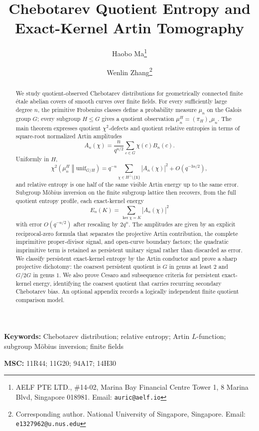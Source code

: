 \documentclass[12pt,a4paper]{article}
\title{Chebotarev Quotient Entropy and Exact-Kernel Artin Tomography}
\author{
  Haobo Ma\thanks{AELF PTE LTD., \#14-02, Marina Bay Financial Centre Tower 1, 8 Marina Blvd, Singapore 018981. Email: \texttt{auric@aelf.io}}
  \and
  Wenlin Zhang\thanks{Corresponding author. National University of Singapore, Singapore. Email: \texttt{e1327962@u.nus.edu}}
}
\date{}
\theoremstyle{plain}
\theoremstyle{definition}
\numberwithin{equation}{section}
\newcommand{\ind}{\mathbf{1}}
\newcommand{\etale}{\'etale}
\begin{document}
\maketitle

\begin{abstract}
We study quotient-observed Chebotarev distributions for geometrically connected finite \etale{} abelian covers of smooth curves over finite fields. For every sufficiently large degree \(n\), the primitive Frobenius classes define a probability measure \(\mu_n\) on the Galois group \(G\); every subgroup \(H\le G\) gives a quotient observation \(\mu_n^H=(\pi_H)_\ast\mu_n\). The main theorem expresses quotient \(\chi^2\)-defects and quotient relative entropies in terms of square-root normalized Artin amplitudes
\[
A_n(\chi)=\frac{n}{q^{n/2}}\sum_{c\in G}\chi(c)B_n(c).
\]
Uniformly in \(H\),
\[
\chi^2\!\left(\mu_n^H\middle\|\mathrm{unif}_{G/H}\right)
=q^{-n}\sum_{\chi\in H^\perp\setminus\{\ind\}}|A_n(\chi)|^2+O(q^{-3n/2}),
\]
and relative entropy is one half of the same visible Artin energy up to the same error. Subgroup M\"obius inversion on the finite subgroup lattice then recovers, from the full quotient entropy profile, each exact-kernel energy
\[
E_n(K)=\sum_{\ker\chi=K}|A_n(\chi)|^2
\]
with error \(O(q^{-n/2})\) after rescaling by \(2q^n\). The amplitudes are given by an explicit reciprocal-zero formula that separates the projective Artin contribution, the complete imprimitive proper-divisor signal, and open-curve boundary factors; the quadratic imprimitive term is retained as persistent unitary signal rather than discarded as error. We classify persistent exact-kernel entropy by the Artin conductor and prove a sharp projective dichotomy: the coarsest persistent quotient is \(G\) in genus at least \(2\) and \(G/2G\) in genus \(1\). We also prove Cesaro and subsequence criteria for persistent exact-kernel energy, identifying the coarsest quotient that carries recurring secondary Chebotarev bias. An optional appendix records a logically independent finite quotient comparison model.
\end{abstract}

\noindent\textbf{Keywords:} Chebotarev distribution; relative entropy; Artin \(L\)-function; subgroup M\"obius inversion; finite fields

\medskip
\noindent\textbf{MSC:} 11R44; 11G20; 94A17; 14H30


\end{document}

